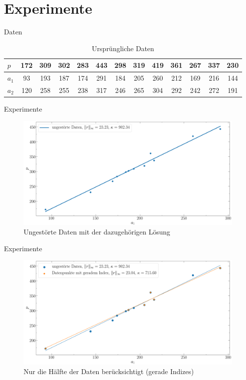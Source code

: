 \documentclass{beamer}
\begin{document}
\section{Experimente}

\begin{frame}{Daten}
	\begin{table}\small
		\begin{tabular}{l || c c c c c c c c c c c c}
			$p$ & 172 & 309 & 302 & 283 & 443 & 298 & 319 & 419 & 361 & 267 & 337 & 230\\
			\hline
			$a_1$ & 93 & 193 & 187 & 174 & 291 & 184 & 205 & 260 &212 & 169 & 216 & 144\\
			\hline
			$a_2$ & 120 & 258 & 255 & 238 & 317 & 246 & 265 & 304 & 292 & 242 & 272 & 191\\
		\end{tabular}
		\caption{Ursprüngliche Daten}
	\end{table}
\end{frame}

\begin{frame}{Experimente}
	\begin{figure}
		\includegraphics[width=\textwidth]{Bilder/ungest+.png}
		\caption{Ungestörte Daten mit der dazugehörigen Lösung}
	\end{figure}
\end{frame}

\begin{frame}{Experimente}
	\begin{figure}
		\includegraphics[width=\textwidth]{Bilder/ungest+gerad.png}
		\caption{Nur die Hälfte der Daten berücksichtigt (gerade Indizes)}
	\end{figure}
 \end{frame}
\end{document}
